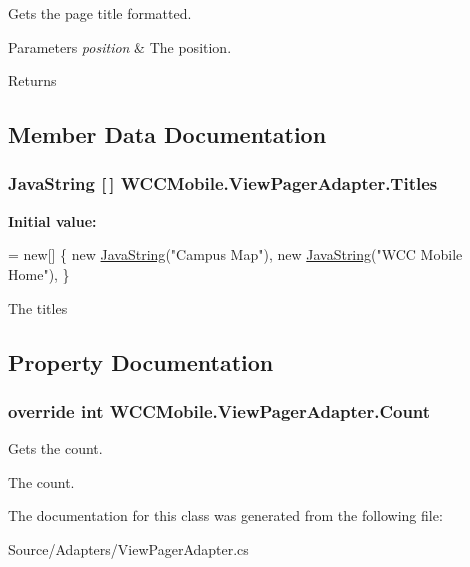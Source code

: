 Gets the page title formatted. 


\begin{DoxyParams}{Parameters}
{\em position} & The position.\\
\hline
\end{DoxyParams}
\begin{DoxyReturn}{Returns}

\end{DoxyReturn}


\subsection{Member Data Documentation}
\subsubsection[{\texorpdfstring{Titles}{Titles}}]{\setlength{\rightskip}{0pt plus 5cm}Java\+String \mbox{[}$\,$\mbox{]} W\+C\+C\+Mobile.\+View\+Pager\+Adapter.\+Titles\hspace{0.3cm}{\ttfamily [static]}}\hypertarget{class_w_c_c_mobile_1_1_view_pager_adapter_ac9cb2ad630a3ffe31a38166ae81df3ea}{}\label{class_w_c_c_mobile_1_1_view_pager_adapter_ac9cb2ad630a3ffe31a38166ae81df3ea}
{\bfseries Initial value\+:}
\begin{DoxyCode}
= \textcolor{keyword}{new}[]
        \{
            \textcolor{keyword}{new} \hyperlink{namespace_java_string}{JavaString}(\textcolor{stringliteral}{"Campus Map"}),
            \textcolor{keyword}{new} \hyperlink{namespace_java_string}{JavaString}(\textcolor{stringliteral}{"WCC Mobile Home"}),
        \}
\end{DoxyCode}


The titles 



\subsection{Property Documentation}
\subsubsection[{\texorpdfstring{Count}{Count}}]{\setlength{\rightskip}{0pt plus 5cm}override int W\+C\+C\+Mobile.\+View\+Pager\+Adapter.\+Count\hspace{0.3cm}{\ttfamily [get]}}\hypertarget{class_w_c_c_mobile_1_1_view_pager_adapter_a6285d36f4653b2102da80b35b341dd47}{}\label{class_w_c_c_mobile_1_1_view_pager_adapter_a6285d36f4653b2102da80b35b341dd47}


Gets the count. 

The count. 

The documentation for this class was generated from the following file\+:\begin{DoxyCompactItemize}
\item 
Source/\+Adapters/View\+Pager\+Adapter.\+cs\end{DoxyCompactItemize}
